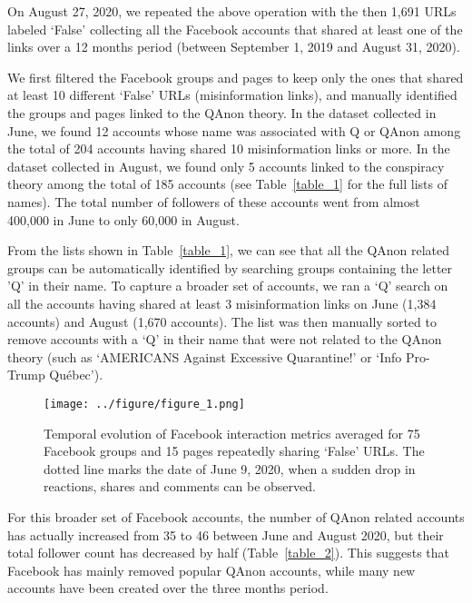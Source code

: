 \documentclass[sigconf]{acmart}
\begin{document}
On August 27, 2020, we repeated the above operation with the then 1,691 URLs labeled `False' collecting all the Facebook accounts that shared at least one of the links over a 12 months period (between September 1, 2019 and August 31, 2020).

We first filtered the Facebook groups and pages to keep only the ones that shared at least 10 different `False' URLs (misinformation links), and manually identified the groups and pages linked to the QAnon theory. In the dataset collected in June, we found 12 accounts whose name was associated with Q or QAnon among the total of 204 accounts having shared 10 misinformation links or more. In the dataset collected in August, we found only 5 accounts linked to the conspiracy theory among the total of 185 accounts (see Table~\ref{table_1} for the full lists of names). The total number of followers of these accounts went from almost 400,000 in June to only 60,000 in August.

From the lists shown in Table~\ref{table_1}, we can see that all the QAnon related groups can be automatically identified by searching groups containing the letter 'Q' in their name. To capture a broader set of accounts, we ran a `Q' search on all the accounts having shared at least 3 misinformation links on June (1,384 accounts) and August (1,670 accounts). The list was then manually sorted to remove accounts with a `Q' in their name that were not related to the QAnon theory (such as `AMERICANS Against Excessive Quarantine!' or `Info Pro-Trump Qu\'ebec').

\begin{figure}[h]
  \centering
  \texttt{[image: ../figure/figure\_1.png]}
  \caption{Temporal evolution of Facebook interaction metrics averaged for 75 Facebook groups and 15 pages repeatedly sharing `False' URLs. The dotted line marks the date of June 9, 2020, when a sudden drop in reactions, shares and comments can be observed.}
  \label{figure_1}
\end{figure} 

For this broader set of Facebook accounts, the number of QAnon related accounts has actually increased from 35 to 46 between June and August 2020, but their total follower count has decreased by half (Table~\ref{table_2}). This suggests that Facebook has mainly removed popular QAnon accounts, while many new accounts have been created over the three months period.
\end{document}

